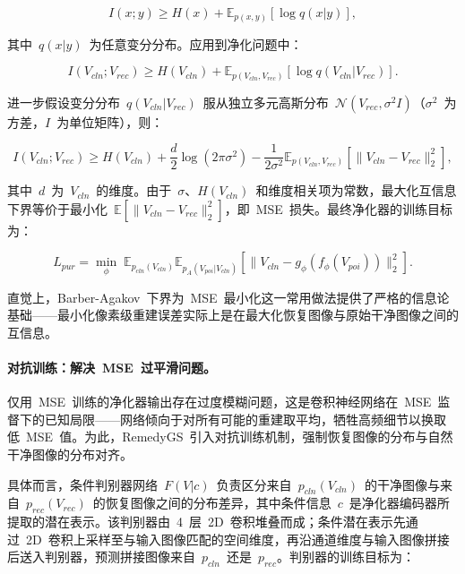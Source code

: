 \begin{equation}
I(x; y) \geq H(x) + \mathbb{E}_{p(x,y)}[\log q(x|y)],
\end{equation}

其中~$q(x|y)$~为任意变分分布。应用到净化问题中：

\begin{equation}
I(V_{cln}; V_{rec}) \geq H(V_{cln}) + \mathbb{E}_{p(V_{cln}, V_{rec})}[\log q(V_{cln}|V_{rec})].
\end{equation}

进一步假设变分分布~$q(V_{cln}|V_{rec})$~服从独立多元高斯分布~$\mathcal{N}(V_{rec}, \sigma^2 I)$（$\sigma^2$~为方差，$I$~为单位矩阵），则：

\begin{equation}
I(V_{cln}; V_{rec}) \geq H(V_{cln}) + \frac{d}{2}\log(2\pi\sigma^2) - \frac{1}{2\sigma^2}\mathbb{E}_{p(V_{cln}, V_{rec})}[\|V_{cln} - V_{rec}\|_2^2],
\end{equation}

其中~$d$~为~$V_{cln}$~的维度。由于~$\sigma$、$H(V_{cln})$~和维度相关项为常数，最大化互信息下界等价于最小化~$\mathbb{E}[\|V_{cln} - V_{rec}\|_2^2]$，即~MSE~损失。最终净化器的训练目标为：

\begin{equation}
L_{pur} = \min_\phi\; \mathbb{E}_{p_{cln}(V_{cln})} \mathbb{E}_{p_A(V_{poi}|V_{cln})} [\|V_{cln} - g_\phi(f_\phi(V_{poi}))\|_2^2].
\end{equation}

直觉上，Barber-Agakov~下界为~MSE~最小化这一常用做法提供了严格的信息论基础——最小化像素级重建误差实际上是在最大化恢复图像与原始干净图像之间的互信息。

\paragraph{对抗训练：解决~MSE~过平滑问题。}
仅用~MSE~训练的净化器输出存在过度模糊问题，这是卷积神经网络在~MSE~监督下的已知局限——网络倾向于对所有可能的重建取平均，牺牲高频细节以换取低~MSE~值。为此，RemedyGS~引入对抗训练机制，强制恢复图像的分布与自然干净图像的分布对齐。

具体而言，条件判别器网络~$F(V|c)$~负责区分来自~$p_{cln}(V_{cln})$~的干净图像与来自~$p_{rec}(V_{rec})$~的恢复图像之间的分布差异，其中条件信息~$c$~是净化器编码器所提取的潜在表示。该判别器由~4~层~2D~卷积堆叠而成；条件潜在表示先通过~2D~卷积上采样至与输入图像匹配的空间维度，再沿通道维度与输入图像拼接后送入判别器，预测拼接图像来自~$p_{cln}$~还是~$p_{rec}$。判别器的训练目标为：

